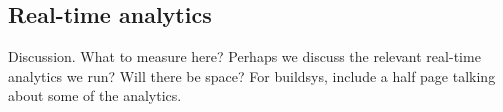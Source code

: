 \subsection{Real-time analytics}
Discussion.  What to measure here?  Perhaps we discuss the relevant real-time analytics we run?  Will there be space?  For buildsys, include a half page talking about some of the analytics.






